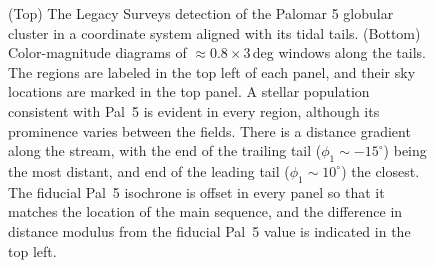 \documentclass[modern]{aastex62}
\begin{document}
\begin{figure}
\begin{center}
\end{center}
\caption{
(Top) The Legacy Surveys detection of the Palomar 5 globular cluster in a coordinate system aligned with its tidal tails.
(Bottom) Color-magnitude diagrams of $\approx0.8\times3$\,deg windows along the tails.
The regions are labeled in the top left of each panel, and their sky locations are marked in the top panel.
A stellar population consistent with Pal~5 is evident in every region, although its prominence varies between the fields.
There is a distance gradient along the stream, with the end of the trailing tail ($\phi_1\sim-15^\circ$) being the most distant, and end of the leading tail ($\phi_1\sim10^\circ$) the closest.
The fiducial Pal~5 isochrone is offset in every panel so that it matches the location of the main sequence, and the difference in distance modulus from the fiducial Pal~5 value is indicated in the top left.
}
\label{fig:cmds}
\end{figure}
\end{document}
